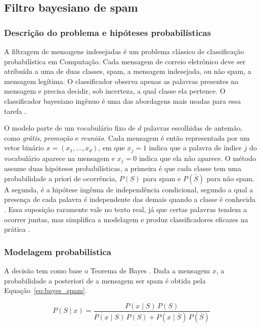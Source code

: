 \subsection{Filtro bayesiano de spam}

\subsubsection{Descrição do problema e hipóteses probabilísticas}

A filtragem de mensagens indesejadas é um problema clássico de classificação
probabilística em Computação. Cada mensagem de correio eletrônico deve ser
atribuída a uma de duas classes, spam, a mensagem indesejada, ou não spam, a
mensagem legítima. O classificador observa apenas as palavras presentes na
mensagem e precisa decidir, sob incerteza, a qual classe ela pertence. O
classificador bayesiano ingênuo é uma das abordagens mais usadas para essa
tarefa \cite{metsis2006spam}.

O modelo parte de um vocabulário fixo de $d$ palavras escolhidas de antemão,
como \textit{grátis}, \textit{promoção} e \textit{reunião}. Cada mensagem é então
representada por um vetor binário $x = (x_1, \ldots, x_d)$, em que $x_j = 1$ indica
que a palavra de índice $j$ do vocabulário aparece na mensagem e $x_j = 0$ indica
que ela não aparece. O método assume duas hipóteses probabilísticas, a primeira é
que cada classe tem uma probabilidade a priori de ocorrência, $P(S)$ para spam e
$P(\bar{S})$ para não spam. A segunda, é a hipótese
ingênua de independência condicional, segundo a qual a presença de cada palavra
é independente das demais quando a classe é conhecida \cite{sahami1998bayesian}.
Essa suposição raramente vale no texto real, já que certas palavras tendem a
ocorrer juntas, mas simplifica a modelagem e produz classificadores eficazes na
prática \cite{metsis2006spam}.

\subsubsection{Modelagem probabilística}

A decisão tem como base o Teorema de Bayes \cite{chan2021probability}. Dada a
mensagem $x$, a probabilidade a posteriori de a mensagem ser spam é obtida pela
Equação~\ref{eq:bayes_spam}.

\begin{equation}
	P(S \mid x) = \frac{P(x \mid S)\, P(S)}{P(x \mid S)\, P(S) + P(x \mid \bar{S})\, P(\bar{S})}
	\label{eq:bayes_spam}
\end{equation}


